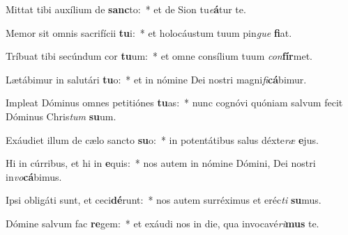 \item Mittat tibi auxílium de \textbf{sanc}to:~* et de Sion tu\textit{e}\textbf{á}tur te.
\item Memor sit omnis sacrifícii \textbf{tu}i:~* et holocáustum tuum pin\textit{gue} \textbf{fi}at.
\item Tríbuat tibi secúndum cor \textbf{tu}um:~* et omne consílium tuum \textit{con}\textbf{fír}met.
\item Lætábimur in salutári \textbf{tu}o:~* et in nómine Dei nostri magni\textit{fi}\textbf{cá}bimur.
\item Impleat Dóminus omnes petitiónes \textbf{tu}as:~* nunc cognóvi quóniam salvum fecit Dóminus Chris\textit{tum} \textbf{su}um.
\item Exáudiet illum de cælo sancto \textbf{su}o:~* in potentátibus salus déxte\textit{ræ} \textbf{e}jus.
\item Hi in cúrribus, et hi in \textbf{e}quis:~* nos autem in nómine Dómini, Dei nostri in\textit{vo}\textbf{cá}bimus.
\item Ipsi obligáti sunt, et ceci\textbf{dé}runt:~* nos autem surréximus et eréc\textit{ti} \textbf{su}mus.
\item Dómine salvum fac \textbf{re}gem:~* et exáudi nos in die, qua invocavé\textit{ri}\textbf{mus} te.
